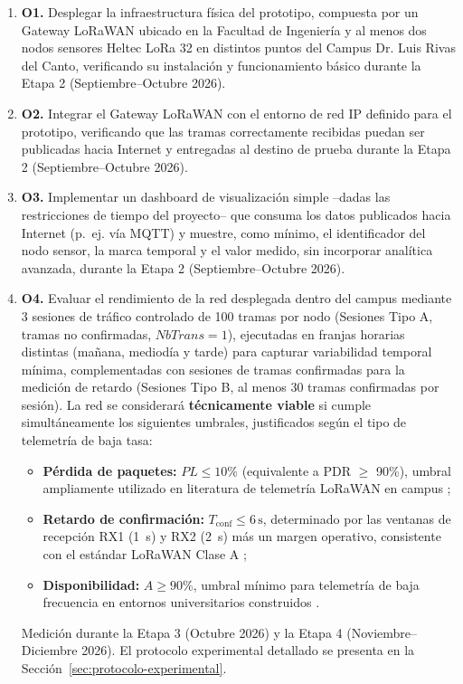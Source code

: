\documentclass[12pt,oneside,openany,spanish,oldfontcommands]{memoir}
\begin{document}
\begin{enumerate}
  \item \textbf{O1.} Desplegar la infraestructura física del prototipo, compuesta por un
  Gateway LoRaWAN ubicado en la Facultad de Ingeniería y al menos dos nodos sensores Heltec
  LoRa 32 en distintos puntos del Campus Dr. Luis Rivas del Canto, verificando su instalación
  y funcionamiento básico durante la Etapa 2 (Septiembre--Octubre 2026).

  \item \textbf{O2.} Integrar el Gateway LoRaWAN con el entorno de red IP definido para el
  prototipo, verificando que las tramas correctamente recibidas puedan ser publicadas
  hacia Internet y entregadas al destino de prueba durante la Etapa 2
  (Septiembre--Octubre 2026).

  \item \textbf{O3.} Implementar un dashboard de visualización simple --dadas las
  restricciones de tiempo del proyecto-- que consuma los datos publicados hacia Internet
  (p.~ej. vía MQTT) y muestre, como mínimo, el identificador del nodo sensor, la marca
  temporal y el valor medido, sin incorporar analítica avanzada, durante la Etapa 2
  (Septiembre--Octubre 2026).

  \item \textbf{O4.} Evaluar el rendimiento de la red desplegada dentro del campus
  mediante 3 sesiones de tráfico controlado de 100 tramas por nodo (Sesiones Tipo A,
  tramas no confirmadas, $NbTrans = 1$), ejecutadas en franjas horarias distintas (mañana,
  mediodía y tarde) para capturar variabilidad temporal mínima, complementadas con
  sesiones de tramas confirmadas para la medición de retardo (Sesiones Tipo B, al menos
  30 tramas confirmadas por sesión). La red se considerará \textbf{técnicamente viable}
  si cumple simultáneamente los siguientes umbrales, justificados según el tipo de
  telemetría de baja tasa:
  \begin{itemize}
    \item \textbf{Pérdida de paquetes:} $PL \leq 10\%$ (equivalente a PDR $\geq$ 90\%),
    umbral ampliamente utilizado en literatura de telemetría LoRaWAN en campus
    \parencite{kaur2024campus,ahmed2024vegetacion};
    \item \textbf{Retardo de confirmación:} $T_{\mathrm{conf}} \leq 6\,\text{s}$,
    determinado por las ventanas de recepción RX1 (1~s) y RX2 (2~s) más un margen
    operativo, consistente con el estándar LoRaWAN Clase A \parencite{lorawan1_0_4};
    \item \textbf{Disponibilidad:} $A \geq 90\%$, umbral mínimo para telemetría de baja
    frecuencia en entornos universitarios construidos \parencite{barrachina2023campus}.
  \end{itemize}
  Medición durante la Etapa 3 (Octubre 2026) y la Etapa 4 (Noviembre--Diciembre 2026).
  El protocolo experimental detallado se presenta en la Sección~\ref{sec:protocolo-experimental}.
\end{enumerate}
\end{document}
